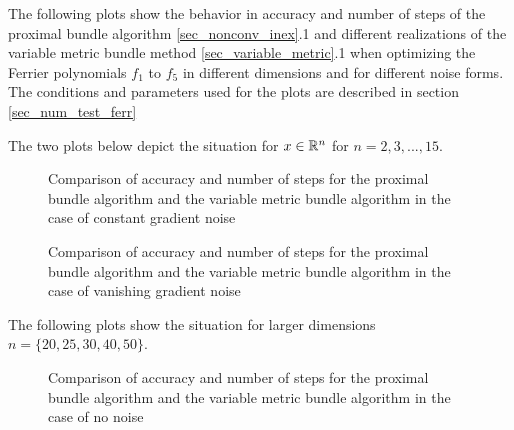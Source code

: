 The following plots show the behavior in accuracy and number of steps of the proximal bundle algorithm \ref{sec_nonconv_inex}.1 and different realizations of the variable metric bundle method \ref{sec_variable_metric}.1 when optimizing the Ferrier polynomials \(f_1\) to \(f_5\) in different dimensions and for different noise forms.
The conditions and parameters used for the plots are described in section \ref{sec_num_test_ferr}

The two plots below depict the situation for \(x \in \mathbb{R}^n\) for \(n = 2,3,...,15\).

\begin{figure}[H]
	\begin{subfigure}{0.49\textwidth}
	\end{subfigure}
	\begin{subfigure}{0.49\textwidth}
	\end{subfigure}
	\caption[Accuracy and number of steps for: constant gradient noise]{Comparison of accuracy and number of steps for the proximal bundle algorithm and the variable metric bundle algorithm in the case of constant gradient noise}%
	\label{fig_const_grad_noise}%
\end{figure}

\vspace{-1.5em}

\begin{figure}[H]
	\begin{subfigure}{0.49\textwidth}
	\end{subfigure}
	\begin{subfigure}{0.49\textwidth}
	\end{subfigure}
	\caption[Accuracy and number of steps: vanishing gradient noise]{Comparison of accuracy and number of steps for the proximal bundle algorithm and the variable metric bundle algorithm in the case of vanishing gradient noise}%
	\label{fig_van_grad_noise}%
\end{figure}


The following plots show the situation for larger dimensions \(n = \{20,25,30,40,50\}\).


\begin{figure}[H]%
	\begin{subfigure}{0.49\textwidth}
	\end{subfigure}
	\begin{subfigure}{0.49\textwidth}
	\end{subfigure}
	\caption[Accuracy and number of steps: no noise, higher dimensions]{Comparison of accuracy and number of steps for the proximal bundle algorithm and the variable metric bundle algorithm in the case of no noise}
	\label{fig_no_noise_large}

\end{figure}

